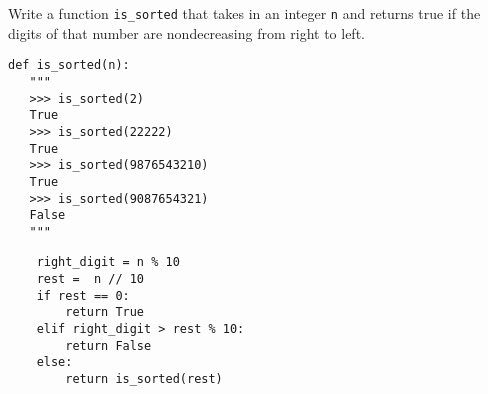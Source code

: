 \begin{blocksection}
\question Write a function \lstinline$is_sorted$ that takes in an integer
\lstinline$n$ and returns true if the digits of that number are nondecreasing from
right to left.

\begin{lstlisting}
def is_sorted(n):
   """
   >>> is_sorted(2)
   True
   >>> is_sorted(22222)
   True
   >>> is_sorted(9876543210)
   True
   >>> is_sorted(9087654321)
   False
   """
\end{lstlisting}
\end{blocksection}


\begin{blocksection}
\begin{solution}[1in]
\begin{lstlisting}
    right_digit = n % 10
    rest =  n // 10
    if rest == 0:
        return True
    elif right_digit > rest % 10:
        return False
    else:
        return is_sorted(rest)
\end{lstlisting}
\end{solution}
\end{blocksection}
